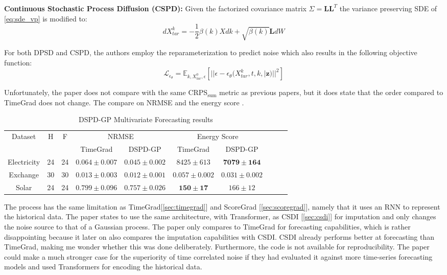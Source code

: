 \textbf{Continuous Stochastic Process Diffusion (CSPD):}
Given the factorized covariance matrix $\Sigma = \mathbf{L}\mathbf{L}^T$ the variance preserving SDE of \autoref{eq:sde_vp} is modified to:
\begin{equation}
    dX_{tar}^k = -\frac{1}{2}\beta(k) X dk + \sqrt{\beta(k)}\mathbf{L}dW
\end{equation}

For both DPSD and CSPD, the authors employ the reparameterization to predict noise which also results in the following objective function:
\begin{equation}
    \mathcal{L}_{\epsilon_\theta} = \mathbb{E}_{k, X_{tar}^0, \epsilon} \left[|| \epsilon - \epsilon_\theta(X_{tar}^k,  t, k, | \mathbf{z})||^2 \right]
\end{equation}

Unfortunately, the paper does not compare with the same CRPS$_{\text{sum}}$ metric as previous papers, but it does state that the order compared to TimeGrad does not change. The compare on NRMSE and the energy score \cite{gneiting_strictly_2007}.


\begin{table}[ht]
    \centering
    \begin{tabular}{cccccccccc}
        \toprule
        \multirow{2}{*}{Dataset} & \multirow{2}{*}{H} & \multirow{2}{*}{F} & \multicolumn{2}{c}{NRMSE} & \multicolumn{2}{c}{Energy Score} \\
        \cmidrule(lr){4-5} \cmidrule(lr){6-7}
         & & & TimeGrad & DSPD-GP & TimeGrad & DSPD-GP \\
        \midrule
        Electricity & 24  & 24  & $0.064 \pm 0.007$ & $\mathbf{0.045 \pm 0.002}$ & $8425 \pm 613$ & $\mathbf{7079 \pm 164}$ \\
        \midrule
        Exchange & 30  & 30  & $0.013 \pm 0.003$ & $\mathbf{0.012 \pm 0.001}$ & $0.057 \pm 0.002$ & $\mathbf{0.031 \pm 0.002}$ \\
        \midrule
        Solar & 24  & 24  & $0.799 \pm 0.096$ & $\mathbf{0.757 \pm 0.026}$ & $\mathbf{150 \pm 17}$ & $166 \pm 12$ \\
        \bottomrule
    \end{tabular}
    \caption{DSPD-GP Multivariate Forecasting results \cite{bilos_modeling_2022}}
    \label{tab:dspd-gp-results}
\end{table}

The process has the same limitation as TimeGrad[\ref{sec:timegrad}] and ScoreGrad [\ref{sec:scoregrad}], namely that it uses an RNN to represent the historical data. The paper states to use the same architecture, with Transformer, as CSDI [\ref{sec:csdi}] for imputation and only changes the noise source to that of a Gaussian process. The paper only compares to TimeGrad for forecasting capabilities, which is rather disappointing because it later on also compares the imputation capabilities with CSDI. CSDI already performs better at forecasting than TimeGrad, making me wonder whether this was done deliberately. Furthermore, the code is not available for reproducibility. The paper could make a much stronger case for the superiority of time correlated noise if they had evaluated it against more time-series forecasting models and used Transformers for encoding the historical data.